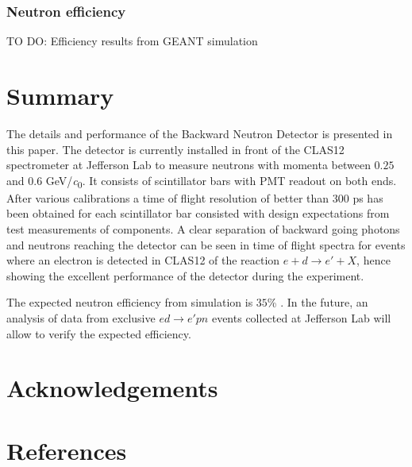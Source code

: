 \documentclass[3p,final,twocolumn]{elsarticle}
\begin{document}
\subsubsection{Neutron efficiency}
TO DO: Efficiency results from GEANT simulation




\section{Summary}
The details and performance of the Backward Neutron Detector is presented in this paper. The detector is currently installed in front of the CLAS12 spectrometer at Jefferson Lab to measure neutrons with momenta between $0.25$ and $0.6$ \si{\GeV/\clight}.  It consists of scintillator bars with PMT readout on both ends.
After various calibrations a time of flight resolution of better than 300 \si{\pico\s} has been obtained for each scintillator bar consisted with design expectations from test measurements of components. A clear separation of backward going photons and neutrons reaching the detector can be seen in time of flight spectra for events where an electron is detected in CLAS12 of the reaction $e+d \rightarrow e'+X$, hence showing the excellent performance of the detector during the experiment.

The expected neutron efficiency from simulation is $35$\% . In the future, an analysis of data from exclusive $ed \rightarrow e'pn$ events collected at Jefferson Lab will allow to verify the expected efficiency.


\section{Acknowledgements}



\section*{References}



 
\end{document}
